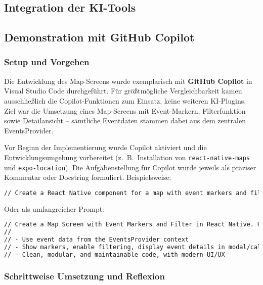 \subsection{Integration der KI-Tools}

\subsection{Demonstration mit GitHub Copilot}

\subsubsection{Setup und Vorgehen}
Die Entwicklung des Map-Screens wurde exemplarisch mit \textbf{GitHub Copilot}
in Visual Studio Code durchgeführt. Für größtmögliche Vergleichbarkeit kamen
ausschließlich die Copilot-Funktionen zum Einsatz, keine weiteren KI-Plugins.
Ziel war die Umsetzung eines Map-Screens mit Event-Markern, Filterfunktion
sowie Detailansicht – sämtliche Eventdaten stammen dabei aus dem zentralen
EventsProvider.

Vor Beginn der Implementierung wurde Copilot aktiviert und die
Entwicklungsumgebung vorbereitet (z.~B.\ Installation von
\texttt{react-native-maps} und \texttt{expo-location}). Die Aufgabenstellung
für Copilot wurde jeweils als präziser Kommentar oder Docstring formuliert.
Beispielsweise:

\begin{lstlisting}[language=HTML]
// Create a React Native component for a map with event markers and filter functionality
\end{lstlisting}

Oder als umfangreicher Prompt:
\begin{lstlisting}[language=HTML]
// Create a Map Screen with Event Markers and Filter in React Native. Requirements:
//
// - Use event data from the EventsProvider context
// - Show markers, enable filtering, display event details in modal/callout
// - Clean, modular, and maintainable code, with modern UI/UX
\end{lstlisting}

\subsubsection{Schrittweise Umsetzung und Reflexion}

